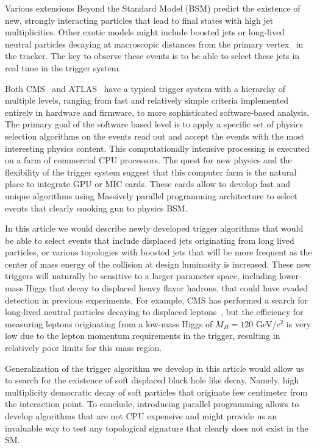 \documentclass{JINST}
\begin{document}
Various extensions Beyond the Standard Model (BSM) predict the existence of new, strongly interacting particles that lead to final states
with high jet multiplicities. Other exotic models might include boosted jets or long-lived neutral particles decaying
at macroscopic distances from the primary vertex~\cite{bib:hiddenvalley} in the tracker. The key to observe these events is to be
able to select these jets in real time in the trigger system.

Both CMS~\cite{Chatrchyan:2008aa} and ATLAS~\cite{Aad:2008zzm} have a typical trigger system with a hierarchy of multiple levels, 
ranging from fast and relatively simple criteria implemented entirely in hardware and firmware, to more sophisticated software-based analysis. 
The primary goal of the software based level is to apply a specific set of 
physics selection algorithms on the events read out and accept the events with the most interesting physics 
content. This computationally intensive processing is executed on a farm of commercial CPU processors.
The quest for new physics and the flexibility of the trigger system suggest that this computer farm is the natural
place to integrate GPU or MIC cards. These cards allow to develop fast and unique algorithms using Massively parallel programming architecture
to select events that clearly smoking gun to physics BSM. 

In this article we would describe newly developed trigger algorithms that would be able to select events
that include displaced jets originating from long lived particles, or various topologies with boosted jets that will
be more frequent as the center of mass energy of the collision at design luminosity is increased. These new
triggers will naturally be sensitive to a larger parameter space, including lower-mass Higgs that decay to
displaced heavy flavor hadrons, that could have evaded detection in previous experiments. For example, CMS has 
performed a search for long-lived neutral particles decaying to displaced leptons~\cite{Chatrchyan:2012jna}, 
but the efficiency for measuring leptons originating from a low-mass Higgs of $M_H = 120$ GeV/$c^2$ is very low 
due to the lepton momentum requirements in the trigger, resulting in relatively poor limits for this mass region.

Generalization of the trigger algorithm we develop in this article would allow us to search for 
 the existence of soft displaced black hole like decay. Namely, high multiplicity democratic decay of soft particles  
that originate few centimeter from the interaction point. To conclude, 
introducing parallel programming allows to develop algorithms that are not CPU expensive and
might provide us an invaluable way to test any topological signature that clearly does not exist in the SM.
\end{document}
